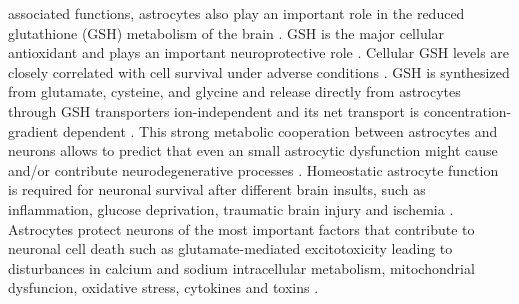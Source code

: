 associated functions, astrocytes also play an important role in the reduced glutathione (GSH) metabolism of the brain \cite{Raps1989}. GSH is the major cellular antioxidant and plays an important neuroprotective role \cite{Jha2016}. Cellular GSH levels are closely correlated with cell survival under adverse conditions \cite{Allaman2011}. GSH is synthesized from glutamate, cysteine, and glycine and release directly from astrocytes through GSH transporters ion-independent and its net transport is concentration-gradient dependent \cite{Wang2000}. This strong metabolic cooperation between astrocytes and neurons allows to predict that even an small astrocytic dysfunction might cause and/or contribute neurodegenerative processes \cite{Maragakis2006}. Homeostatic astrocyte function is required for neuronal survival after different brain insults, such as inflammation, glucose deprivation, traumatic brain injury and ischemia \cite{Avila-Rodriguez2014,Jha2016}. Astrocytes protect neurons of the most important factors that contribute to neuronal cell death such as glutamate-mediated excitotoxicity leading to disturbances in calcium and sodium intracellular metabolism, mitochondrial dysfuncion, oxidative stress, cytokines and toxins \cite{Takuma2004,Lange2012,Nijboer2013,Hussain2013}.

